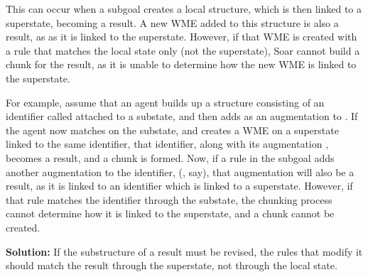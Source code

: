 This can occur when a subgoal creates a local structure, which is then linked to a
superstate, becoming a result. A new WME added to this structure is also a result, as
as it is linked to the superstate. However, if that WME is created
with a rule that matches the local state only (not the superstate), Soar cannot build a chunk for the
result, as it is unable to determine how the new WME is linked to the
superstate.

For example, assume that an agent builds up a structure consisting of an identifier called  attached to a substate, and then adds
 as an augmentation to . If the agent now matches  on the substate, and creates a WME on a
superstate linked to the same identifier, that identifier, along with its augmentation , becomes a result, and a chunk is formed.
Now, if a rule in the subgoal adds another augmentation to the  identifier, (, say), that augmentation will also be 
a result, as it is linked to an identifier which is linked to a superstate. However, if that rule matches the identifier through the substate, the chunking
process cannot determine how it is linked to the superstate, and a chunk cannot be created.


\textbf{Solution:} If the substructure of a result must be revised, the rules
that modify it should match the result through the superstate, not through the
local state.

